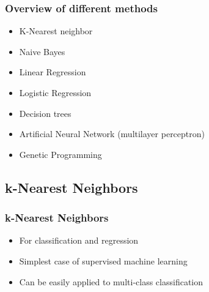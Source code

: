 \documentclass[aspectratio=169]{beamer}
\begin{document}
\begin{frame}
  \frametitle{Overview of different methods}
  \begin{block}{}
    \begin{center}
      \begin{itemize}
      \item K-Nearest neighbor
      \item Naive Bayes
      \item Linear Regression
      \item Logistic Regression
      \item Decision trees
      \item Artificial Neural Network (multilayer perceptron)
      \item Genetic Programming
      \end{itemize}
    \end{center}    
  \end{block}
\end{frame}

\subsection{k-Nearest Neighbors}

\setcounter{tocdepth}{2}
\begin{frame}{}
   \tableofcontents[currentsubsection]
\end{frame}

\begin{frame}
  \frametitle{k-Nearest Neighbors}
  \begin{block}{}
    \begin{center}
      \begin{itemize}
      \item For classification and regression
      \item Simplest case of supervised machine learning
      \item Can be easily applied to multi-class classification
      \end{itemize}
    \end{center}
  \end{block}    
\end{frame}
\end{document}
